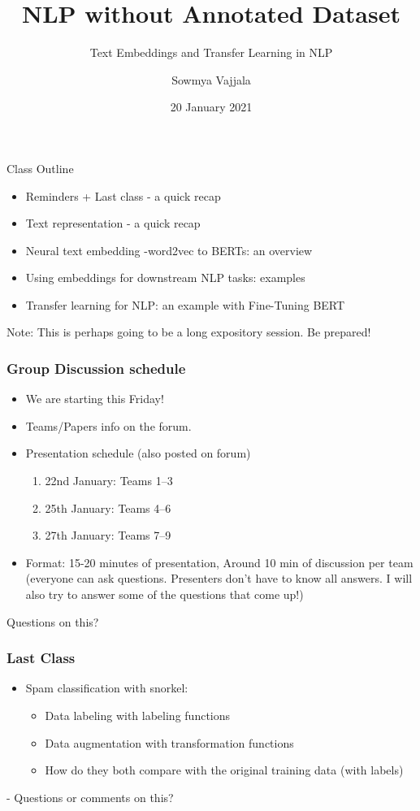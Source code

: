 \documentclass{beamer}
\author[Sowmya Vajjala]{Sowmya Vajjala}
\title[SfSNLP]{NLP without Annotated Dataset}
\subtitle{Text Embeddings and Transfer Learning in NLP}
\date{20 January 2021}
\institute{Seminar f\"ur Sprachwissenschaft, University of T\"ubingen, Germany}
\begin{document}
\begin{frame}\titlepage
\end{frame}

\begin{frame}{Class Outline}
    \begin{itemize}
        \item Reminders + Last class - a quick recap
        \item Text representation - a quick recap
        \item Neural text embedding -word2vec to BERTs: an overview
        \item Using embeddings for downstream NLP tasks: examples
        \item Transfer learning for NLP: an example with Fine-Tuning BERT
        \end{itemize}
        
        Note: This is perhaps going to be a long expository session. Be prepared!
\end{frame}

\begin{frame}
\frametitle{Group Discussion schedule}
\begin{itemize}
\item We are starting this Friday!
    \item Teams/Papers info on the forum.
    \item Presentation schedule  (also posted on forum)
    \begin{enumerate}
        \item 22nd January: Teams 1--3
        \item 25th January: Teams 4--6
        \item 27th January: Teams 7--9
    \end{enumerate}
    \item Format: 15-20 minutes of presentation, Around 10 min of discussion per team (everyone can ask questions. Presenters don't have to know all answers. I will also try to answer some of the questions that come up!)
\end{itemize}
Questions on this? 
\end{frame}


\begin{frame}
\frametitle{Last Class}
\begin{itemize}
\item Spam classification with snorkel:
\begin{itemize}
    \item Data labeling with labeling functions
    \item Data augmentation with transformation functions
    \item How do they both compare with the original training data (with labels)
\end{itemize}
\end{itemize}
- Questions or comments on this? 
\end{frame}
\end{document}
